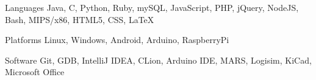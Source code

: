 

\begin{cvskills}

  \cvskill
    {Languages} %
    {Java, C, Python, Ruby, mySQL, JavaScript, PHP, jQuery, NodeJS, Bash, MIPS/x86, HTML5, CSS, LaTeX} %

  \cvskill
    {Platforms} %
    {Linux, Windows, Android, Arduino, RaspberryPi} %

  \cvskill
    {Software} %
    {Git, GDB, IntelliJ IDEA, CLion, Arduino IDE, MARS, Logisim, KiCad, Microsoft Office} %

\end{cvskills}

